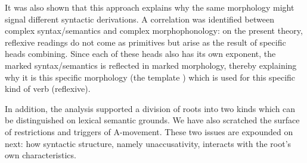 It was also shown that this approach explains why the same morphology might signal different syntactic derivations. A correlation was identified between complex syntax/semantics and complex morphophonology: on the present theory, reflexive readings do not come as primitives but arise as the result of specific heads combining. Since each of these heads also has its own exponent, the marked syntax/semantics is reflected in marked morphology, thereby explaining why it is this specific morphology (the template {\thit}) which is used for this specific kind of verb (reflexive).

In addition, the analysis supported a division of roots into two kinds which can be distinguished on lexical semantic grounds. We have also scratched the surface of restrictions and triggers of A-movement. These two issues are expounded on next: how syntactic structure, namely unaccusativity, interacts with the root's own characteristics.



